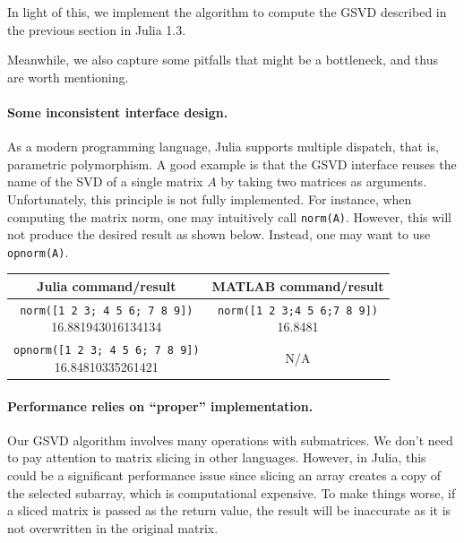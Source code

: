 In light of this, we implement the algorithm to compute the GSVD described in the previous section in Julia 1.3.


Meanwhile, we also capture some pitfalls that might be a bottleneck, and thus are worth mentioning.
\paragraph{Some inconsistent interface design.}
As a modern programming language, Julia supports multiple dispatch, that is, parametric polymorphism. A good example is that the GSVD interface reuses the name of the SVD of a single matrix $A$ by taking two matrices as arguments. Unfortunately, this principle is not fully implemented. For instance, when computing the matrix norm, one may intuitively call \texttt{norm(A)}. However, this will not produce the desired result as shown below. Instead, one may want to use \texttt{opnorm(A)}. 

		\begin{table}[H]
        \centering
        \begin{tabular}{|| c | c ||} 
         \hline
         Julia command/result & MATLAB command/result\\ [0.5ex] 
         \hline\hline
         \makecell{\texttt{norm([1 2 3; 4 5 6; 7 8 9])} \\
		 16.881943016134134} & \makecell{\texttt{norm([1 2 3;4 5 6;7 8 9])} \\ 16.8481} \\
		 \hline\hline
         \makecell{\texttt{opnorm([1 2 3; 4 5 6; 7 8 9])} \\
		 16.84810335261421} & N/A \\
         \hline\hline
        \end{tabular}
        \label{norm-api}
        \end{table}


\paragraph{Performance relies on ``proper'' implementation.}
Our GSVD algorithm involves many operations with submatrices. We don't need to pay attention to matrix slicing in other languages. However, in Julia, this could be a significant performance issue since slicing an array creates a copy of the selected subarray, which is computational expensive.  
To make things worse, if a sliced matrix is passed as the return value, the result will be inaccurate as it is not overwritten in the original matrix. 

